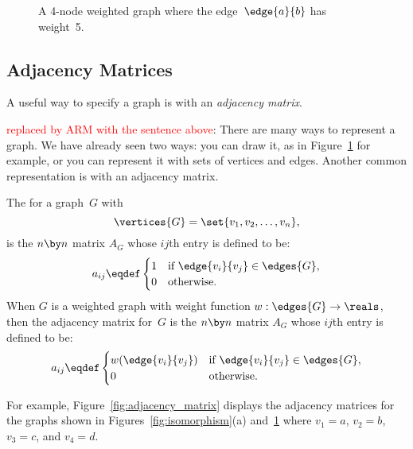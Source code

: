 \begin{figure}


\caption{A 4-node weighted graph where the edge~$\edge{a}{b}$ has
  weight~5.}
\label{fig:weighted_graph}
\end{figure}

\subsection{Adjacency Matrices}

A useful way to specify a graph is with an \emph{adjacency matrix}.

\begin{editingnotes}
\textcolor{red}{replaced by ARM with the sentence above}:
There are many ways to represent a graph.  We have already seen two ways:
you can draw it, as in Figure~\ref{fig:weighted_graph} for example, or you
can represent it with sets of vertices and edges.  Another common
representation is with an adjacency matrix.
\end{editingnotes}

\begin{definition}\label{def:adjacency_matrix}
The  for a graph~$G$ with
\[
\vertices{G} = \set{ v_1, v_2, \dots,v_n },
\]
is the $n \by n$ matrix $A_G$ whose $ij$th entry is defined to be:
\begin{equation*}
    a_{ij} \eqdef \begin{cases}
                1 & \text{if $\edge{v_i}{v_j} \in \edges{G}$}, \\
                0 & \text{otherwise.}
              \end{cases}
\end{equation*}
When $G$ is a weighted graph with weight function $w: \edges{G} \to
\reals$, then the adjacency matrix for~$G$ is the $n \by n$ matrix $A_G$
whose $ij$th entry is defined to be:
\begin{equation*}
    a_{ij} \eqdef \begin{cases}
                w(\edge{v_i}{v_j}) & \text{if $\edge{v_i}{v_j} \in \edges{G}$}, \\
                0                 & \text{otherwise.}
              \end{cases}
\end{equation*}
\end{definition}

For example, Figure~\ref{fig:adjacency_matrix} displays the adjacency
matrices for the graphs shown in Figures~\ref{fig:isomorphism}(a)
and~\ref{fig:weighted_graph} where $v_1 = a$, $v_2 = b$, $v_3 = c$,
and $v_4 = d$.

